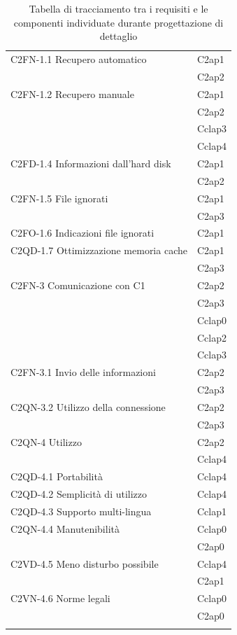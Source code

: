 \begin{footnotesize}
\begin{longtable}[!h]{|l|l|}
C2FN-1.1 Recupero automatico &  C2ap1 \\
& C2ap2\\\hline
C2FN-1.2 Recupero manuale &  C2ap1\\
&  C2ap2 \\
&  Cclap3\\
&  Cclap4\\\hline  
C2FD-1.4 Informazioni dall'hard disk & C2ap1 \\
&  C2ap2\\\hline  
C2FN-1.5 File ignorati &  C2ap1\\    
&  C2ap3  \\\hline
C2FO-1.6 Indicazioni file ignorati &  C2ap1\\\hline 
C2QD-1.7 Ottimizzazione memoria cache &  C2ap1\\
&  C2ap3\\\hline
C2FN-3 Comunicazione con C1 &  C2ap2\\
&  C2ap3\\
&  Cclap0\\
&  Cclap2\\
&  Cclap3\\\hline      
C2FN-3.1 Invio delle informazioni &  C2ap2\\
&  C2ap3\\\hline
C2QN-3.2 Utilizzo della connessione &  C2ap2\\
&  C2ap3\\\hline   
C2QN-4 Utilizzo &  C2ap2\\
&  Cclap4 \\\hline  
C2QD-4.1 Portabilit\`a &  Cclap4\\\hline   
C2QD-4.2 Semplicit\`a di utilizzo  &  Cclap4\\\hline  
C2QD-4.3 Supporto multi-lingua &  Cclap1\\\hline  
C2QN-4.4 Manutenibilit\`a &  Cclap0\\
&  C2ap0\\\hline 
C2VD-4.5 Meno disturbo possibile  &  Cclap4 \\
&  C2ap1 \\\hline                          
C2VN-4.6 Norme legali &  Cclap0\\
&  C2ap0\\\hline   
\caption{Tabella di tracciamento tra i requisiti e le componenti individuate
durante progettazione di dettaglio}
\end{longtable}
\end{footnotesize}

\newpage
